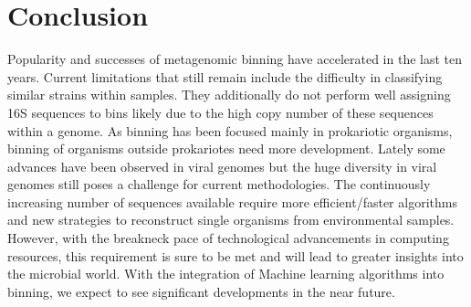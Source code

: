 \documentclass{article}
\begin{document}
\section{Conclusion}
Popularity and successes of metagenomic binning have accelerated in the last ten years.
Current limitations that still remain include the difficulty in classifying similar strains within samples.
They additionally do not perform well assigning 16S sequences to bins likely due to the high copy number of these sequences within a genome.
As binning has been focused mainly in prokariotic organisms, binning of organisms outside prokariotes need more development.
Lately some advances have been observed in viral genomes \cite{nayfach2021metagenomic} but the huge diversity in viral genomes still poses a challenge for current methodologies.
The continuously increasing number of sequences available require more efficient/faster algorithms and new strategies to reconstruct single organisms from environmental samples.
However, with the breakneck pace of technological advancements in computing resources, this requirement is sure to be met and will lead to greater insights into the microbial world.
With the integration of Machine learning algorithms into binning, we expect to see significant developments in the near future.


\end{document}

